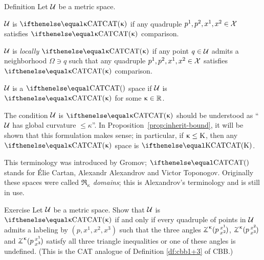 \begin{thm}{Definition}
\label{def:ccat}
Let $\mathcal{U}$ be a metric space.

\begin{subthm}{}
$\mathcal{U}$ is 
$\CAT{\kappa}$ 
if any quadruple $p^1,p^2,x^1,x^2\in \spc{X}$  satisfies  $\CAT{\kappa}$ comparison.
\end{subthm}

\begin{subthm}{}
$\mathcal{U}$ is 
\emph{locally $\CAT{\kappa}$} 
if any point $q\in \spc{U}$ admits a neighborhood $\Omega\ni q$ such that any quadruple $p^1,p^2,x^1,x^2\in \spc{X}$  satisfies  $\CAT\kappa$ comparison.
\end{subthm}

\begin{subthm}{}
$\mathcal{U}$  is a  
$\CAT{}$ space if  $\mathcal{U}$  is $\CAT{\kappa}$ for some $\kappa\in\RR$.
\end{subthm}
\end{thm}



The condition $\mathcal{U}$ is $\CAT\kappa$ should be understood as ``$\mathcal{U}$ has global curvature $\le\kappa$''.
In Proposition~\ref{prop:inherit-bound}, it will be shown that this formulation makes sense; 
in particular, if $\kappa\le\Kappa$, then any $\CAT\kappa$ space is $\CAT\Kappa$.


This terminology was introduced by Gromov;  
$\CAT{}$ stands for \'Elie Cartan, Alexandr Alexandrov and Victor Toponogov.
Originally these spaces were called \emph{$\mathfrak{R}_\kappa$ domains};
this is Alexandrov's terminology and is still in use.


\begin{thm}{Exercise}\label{ex:ccat-(3+1)}
Let $\mathcal{U}$ be a metric space.
Show that $\mathcal{U}$ is $\CAT\kappa$
if and only if every quadruple of points in $\mathcal{U}$ admits a labeling by $(p,x^1,x^2,x^3)$ such that the three angles 
$\angk\kappa p{x^1}{x^2}$,
$\angk\kappa p{x^2}{x^3}$ and
$\angk\kappa p{x^1}{x^3}$
satisfy all three triangle inequalities or one of these angles is undefined.
(This is the CAT analogue of Definition \ref{df:cbb1+3} of CBB.)
\end{thm}

